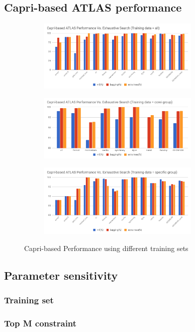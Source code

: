   \subsection{Capri-based ATLAS performance}
  \label{sec:capri_atlas_performance}

  \begin{figure}[tbhp]
    \centering
    \begin{subfigure}[b]{1.0\linewidth}
      \centering
      \includegraphics[width=0.85\textwidth]{images/all_perf.png}
      \caption{ }
      \label{fig:all_perf}
    \end{subfigure}
    \begin{subfigure}[b]{1.0\linewidth}
      \centering
      \includegraphics[width=0.85\textwidth]{images/corei_perf.png}
      \caption{ }
      \label{fig:corei_perf}
    \end{subfigure}
    \begin{subfigure}[b]{1.0\linewidth}
      \centering
      \includegraphics[width=0.85\textwidth]{images/specific_perf.png}
      \caption{ }
      \label{fig:specific_perf}
    \end{subfigure}
  \caption{Capri-based \atl Performance using different training sets}
  \end{figure}

  \subsection{Parameter sensitivity}
  \label{sec:parametersensitivity}

    \subsubsection{Training set}
    \label{sec:training_set}

    \subsubsection{Top M constraint}
    \label{sec:top_m}
